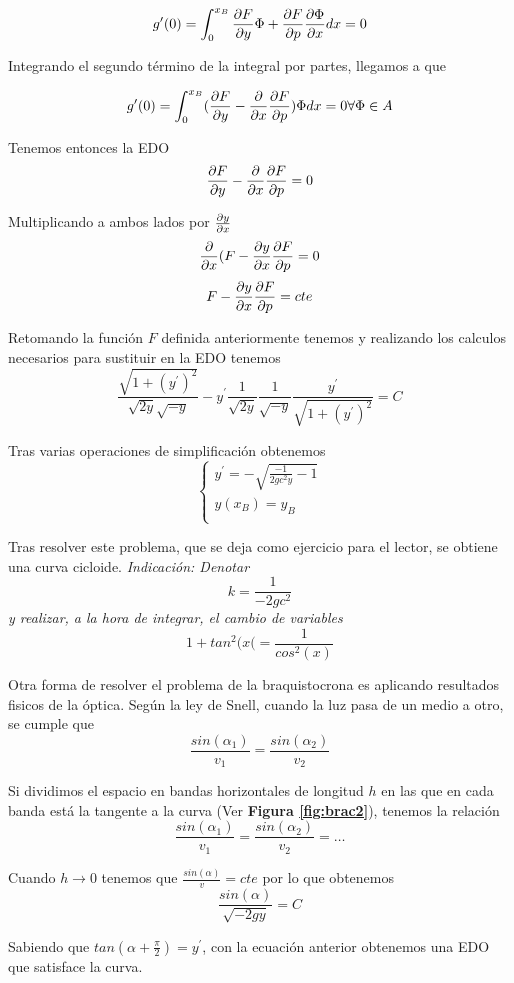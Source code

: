 \documentclass{mathnotes}
\begin{document}
\begin{example}[(Braquistocrona I)]
$$g^\prime(0) = \int_0^{x_B} \partialder{y}{F}\Phi + \partialder{p}{F}\partialder{x}{\Phi}dx = 0$$

Integrando el segundo término de la integral por partes, llegamos a que

$$g^\prime(0) = \int_0^{x_B} (\partialder{y}{F}-\derivative{x}\partialder{p}{F})\Phi dx = 0 \forall \Phi\in A$$

Tenemos entonces la EDO
$$\partialder{y}{F}-\derivative{x}\partialder{p}{F} = 0$$

Multiplicando a ambos lados por $\partialder{x}{y}$
$$\derivative{x}(F-\partialder{x}{y}\partialder{p}{F} = 0$$
$$F-\partialder{x}{y}\partialder{p}{F} = cte$$

Retomando la función $F$ definida anteriormente tenemos y realizando los calculos necesarios para sustituir en la EDO tenemos
$$\frac{\sqrt{1+(y^\prime)^2}}{\sqrt{2y}\sqrt{-y}}-y^\prime\frac{1}{\sqrt{2y}}\frac{1}{\sqrt{-y}}\frac{y^\prime}{\sqrt{1+(y^\prime)^2}}=C$$

Tras varias operaciones de simplificación obtenemos
\begin{equation*}
  \left\lbrace
  \begin{array}{l}
     y^\prime=-\sqrt{\frac{-1}{2gc^2y}-1}\\
	 y(x_B)=y_B\\
  \end{array}
  \right.
\end{equation*}

Tras resolver este problema, que se deja como ejercicio para el lector, se obtiene una curva cicloide.
\vspace{5mm}
\textit{Indicación: Denotar} $$k = \frac{1}{-2gc^2}$$ \textit{y realizar, a la hora de integrar, el cambio de variables} $$1+tan^2(x(=\frac{1}{cos^2(x)}$$
\end{example}


\begin{example}[(Braquistocrona II)]
Otra forma de resolver el problema de la braquistocrona es aplicando resultados fisicos de la óptica.
Según la ley de Snell, cuando la luz pasa de un medio a otro, se cumple que
$$\frac{sin(\alpha_1)}{v_1} = \frac{sin(\alpha_2)}{v_2}$$

Si dividimos el espacio en bandas horizontales de longitud $h$ en las que en cada banda está la tangente a la curva (Ver \textbf{Figura \ref{fig:brac2}}), tenemos la relación
$$\frac{sin(\alpha_1)}{v_1} = \frac{sin(\alpha_2)}{v_2} = \hdots$$

Cuando $h\to 0$ tenemos que $\frac{sin(\alpha)}{v} = cte$ por lo que obtenemos
$$\frac{sin(\alpha)}{\sqrt{-2gy}}=C$$

Sabiendo que $tan(\alpha+\frac{\pi}{2}) = y^\prime$, con la ecuación anterior obtenemos una EDO que satisface la curva.
\end{example}



\printindex
\end{document}
